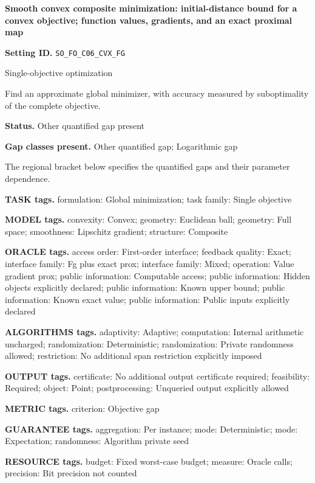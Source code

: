 \documentclass[10pt,a4paper]{article}
\begin{document}
\raggedright

{\LARGE\bfseries\sffamily\color{AtlasNavy} Smooth convex composite minimization: initial-distance bound for a convex objective; function values, gradients, and an exact proximal map\par}\vspace{5pt}
\textbf{Setting ID.} \texttt{SO\_\allowbreak{}FO\_\allowbreak{}C06\_\allowbreak{}CVX\_\allowbreak{}FG}

Single-objective optimization

Find an approximate global minimizer, with accuracy measured by suboptimality of the complete objective.

\textbf{Status.} Other quantified gap present

\textbf{Gap classes present.} Other quantified gap; Logarithmic gap

The regional bracket below specifies the quantified gaps and their parameter dependence.

\textbf{TASK tags.} formulation: Global minimization; task family: Single objective

\textbf{MODEL tags.} convexity: Convex; geometry: Euclidean ball; geometry: Full space; smoothness: Lipschitz gradient; structure: Composite

\textbf{ORACLE tags.} access order: First-order interface; feedback quality: Exact; interface family: Fg plus exact prox; interface family: Mixed; operation: Value gradient prox; public information: Computable access; public information: Hidden objects explicitly declared; public information: Known upper bound; public information: Known exact value; public information: Public inputs explicitly declared

\textbf{ALGORITHMS tags.} adaptivity: Adaptive; computation: Internal arithmetic uncharged; randomization: Deterministic; randomization: Private randomness allowed; restriction: No additional span restriction explicitly imposed

\textbf{OUTPUT tags.} certificate: No additional output certificate required; feasibility: Required; object: Point; postprocessing: Unqueried output explicitly allowed

\textbf{METRIC tags.} criterion: Objective gap

\textbf{GUARANTEE tags.} aggregation: Per instance; mode: Deterministic; mode: Expectation; randomness: Algorithm private seed

\textbf{RESOURCE tags.} budget: Fixed worst-case budget; measure: Oracle calls; precision: Bit precision not counted
\end{document}
